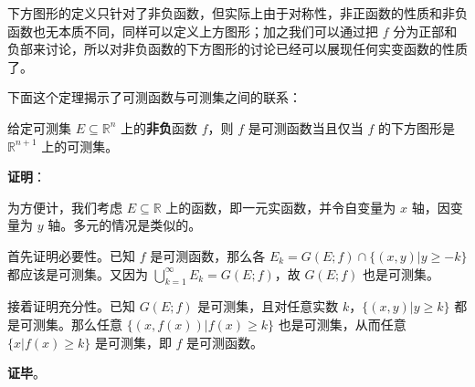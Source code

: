 下方图形的定义只针对了非负函数，但实际上由于对称性，非正函数的性质和非负函数也无本质不同，同样可以定义上方图形；加之我们可以通过把 $f$ 分为正部和负部来讨论，所以对非负函数的下方图形的讨论已经可以展现任何实变函数的性质了。

下面这个定理揭示了可测函数与可测集之间的联系：

\begin{theorem}{}\label{the_MsbFun_4}

给定可测集 $E\subseteq\mathbb{R}^n$ 上的\textbf{非负}函数 $f$，则 $f$ 是可测函数当且仅当 $f$ 的下方图形是 $\mathbb{R}^{n+1}$ 上的可测集。

\end{theorem}

\textbf{证明}：

为方便计，我们考虑 $E\subseteq\mathbb{R}$ 上的函数，即一元实函数，并令自变量为 $x$ 轴，因变量为 $y$ 轴。多元的情况是类似的。

首先证明必要性。已知 $f$ 是可测函数，那么各 $E_k=G(E; f)\cap\{(x, y)|y\geq -k\}$ 都应该是可测集。又因为 $\bigcup^\infty_{k=1} E_k=G(E; f)$，故 $G(E; f)$ 也是可测集。

接着证明充分性。已知 $G(E; f)$ 是可测集，且对任意实数 $k$，$\{(x, y)|y\geq k\}$ 都是可测集。那么任意 $\{(x, f(x))|f(x)\geq k\}$ 也是可测集，从而任意 $\{x|f(x)\geq k\}$ 是可测集，即 $f$ 是可测函数。

\textbf{证毕}。



